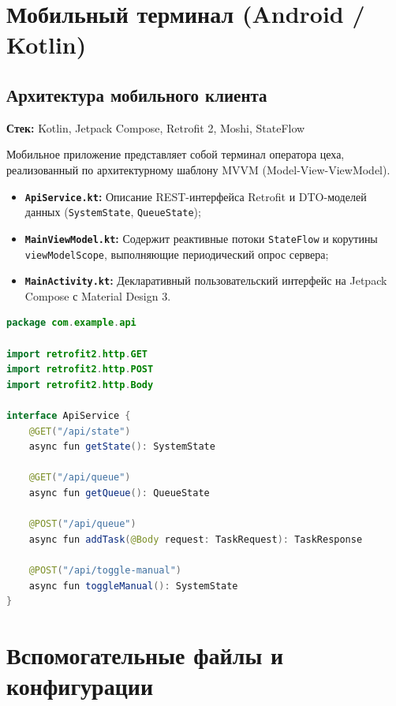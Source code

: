 \documentclass[14pt, a4paper]{extarticle}
\begin{document}
\newpage
\section{Мобильный терминал (Android / Kotlin)}

\subsection{Архитектура мобильного клиента}

\textbf{Стек:} Kotlin, Jetpack Compose, Retrofit 2, Moshi, StateFlow

Мобильное приложение представляет собой терминал оператора цеха, реализованный по архитектурному шаблону MVVM (Model-View-ViewModel).

\begin{itemize}
    \item \textbf{\texttt{ApiService.kt}:} Описание REST-интерфейса Retrofit и DTO-моделей данных (\texttt{SystemState}, \texttt{QueueState});
    \item \textbf{\texttt{MainViewModel.kt}:} Содержит реактивные потоки \texttt{StateFlow} и корутины \texttt{viewModelScope}, выполняющие периодический опрос сервера;
    \item \textbf{\texttt{MainActivity.kt}:} Декларативный пользовательский интерфейс на Jetpack Compose с Material Design 3.
\end{itemize}

\begin{lstlisting}[language=Java, caption=Сетевой интерфейс Retrofit в ApiService.kt]
package com.example.api

import retrofit2.http.GET
import retrofit2.http.POST
import retrofit2.http.Body

interface ApiService {
    @GET("/api/state")
    async fun getState(): SystemState

    @GET("/api/queue")
    async fun getQueue(): QueueState

    @POST("/api/queue")
    async fun addTask(@Body request: TaskRequest): TaskResponse

    @POST("/api/toggle-manual")
    async fun toggleManual(): SystemState
}
\end{lstlisting}

\newpage
\section{Вспомогательные файлы и конфигурации}
\end{document}
